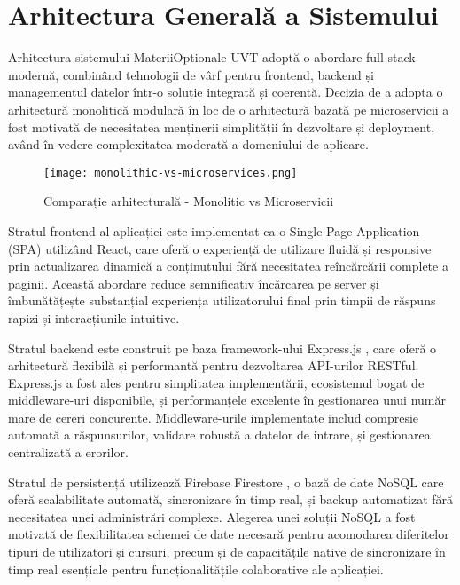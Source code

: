 \documentclass[12pt,a4paper]{report}
\begin{document}
\section{Arhitectura Generală a Sistemului}

Arhitectura sistemului MateriiOptionale UVT adoptă o abordare full-stack modernă, combinând tehnologii de vârf pentru frontend, backend și managementul datelor într-o soluție integrată și coerentă. Decizia de a adopta o arhitectură monolitică modulară în loc de o arhitectură bazată pe microservicii a fost motivată de necesitatea menținerii simplității în dezvoltare și deployment, având în vedere complexitatea moderată a domeniului de aplicare.

\begin{figure}[H]
\centering
\texttt{[image: monolithic-vs-microservices.png]}
\caption{Comparație arhitecturală - Monolitic vs Microservicii}
\label{fig:monolithic-microservices}
\end{figure}

Stratul frontend al aplicației este implementat ca o Single Page Application (SPA) utilizând React, care oferă o experiență de utilizare fluidă și responsive prin actualizarea dinamică a conținutului fără necesitatea reîncărcării complete a paginii. Această abordare reduce semnificativ încărcarea pe server și îmbunătățește substanțial experiența utilizatorului final prin timpii de răspuns rapizi și interacțiunile intuitive.

Stratul backend este construit pe baza framework-ului Express.js \cite{expressjs}, care oferă o arhitectură flexibilă și performantă pentru dezvoltarea API-urilor RESTful. Express.js a fost ales pentru simplitatea implementării, ecosistemul bogat de middleware-uri disponibile, și performanțele excelente în gestionarea unui număr mare de cereri concurente. Middleware-urile implementate includ compresie automată a răspunsurilor, validare robustă a datelor de intrare, și gestionarea centralizată a erorilor.

Stratul de persistență utilizează Firebase Firestore \cite{firebase}, o bază de date NoSQL 
care oferă scalabilitate automată, sincronizare în timp real, și backup automatizat fără necesitatea unei administrări complexe. Alegerea unei soluții NoSQL a fost motivată de flexibilitatea schemei de date necesară pentru acomodarea diferitelor tipuri de utilizatori și cursuri, precum și de capacitățile native de sincronizare în timp real esențiale pentru funcționalitățile colaborative ale aplicației.
\end{document}
